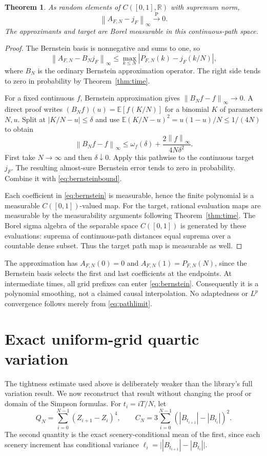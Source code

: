 \documentclass[11pt]{article}
\newtheorem{theorem}{Theorem}[section]
\theoremstyle{remark}\newtheorem{remark}[theorem]{Remark}
\newcommand{\R}{\mathbb R}\newcommand{\Pconv}{\xrightarrow{\mathrm P}}
\newcommand{\norm}[1]{\left\lVert#1\right\rVert}
\begin{document}
\begin{theorem}\label{thm:path}
As random elements of $C([0,1],\R)$ with supremum norm,
\begin{equation}\label{eq:pathlimit}
 \norm{A_{F,N}-j_F}_\infty\Pconv0.
\end{equation}
The approximants and target are Borel measurable in this
continuous-path space.
\end{theorem}
\begin{proof}
The Bernstein basis is nonnegative and sums to one, so
\begin{equation}\label{eq:bernsteinbound}
 \norm{A_{F,N}-B_Nj_F}_\infty
 \leq\max_{k\leq N}|P_{F,N}(k)-j_F(k/N)|,
\end{equation}
where $B_N$ is the ordinary Bernstein approximation operator.
The right side tends to zero in probability by
Theorem~\ref{thm:time}.

For a fixed continuous $f$, Bernstein approximation gives
$\norm{B_Nf-f}_\infty\to0$. A direct
proof writes $(B_Nf)(u)=\mathbb E[f(K/N)]$ for a binomial
$K$ of parameters $N,u$. Split at $|K/N-u|\leq\delta$ and use
$\mathbb E(K/N-u)^2=u(1-u)/N\leq1/(4N)$ to obtain
\[
 \norm{B_Nf-f}_\infty
 \leq\omega_f(\delta)+\frac{2\norm f_\infty}{4N\delta^2}.
\]
First take $N\to\infty$ and then $\delta\downarrow0$.
Apply this pathwise to the continuous target $j_F$.
The resulting almost-sure Bernstein error tends to zero in
probability. Combine it with \eqref{eq:bernsteinbound}.

Each coefficient in \eqref{eq:bernstein} is measurable, hence
the finite polynomial is a measurable $C([0,1])$-valued map.
For the target, rational evaluation maps are measurable by
the measurability arguments following Theorem~\ref{thm:time}.
The Borel sigma algebra of the separable space $C([0,1])$ is
generated by these evaluations: suprema of continuous-path
distances equal suprema over a countable dense subset. Thus the
target path map is measurable as well.
\end{proof}

The approximation has $A_{F,N}(0)=0$ and
$A_{F,N}(1)=P_{F,N}(N)$, since the Bernstein basis selects the
first and last coefficients at the endpoints. At intermediate
times, all grid prefixes can enter \eqref{eq:bernstein}.
Consequently it is a polynomial smoothing, not a claimed causal
interpolation. No adaptedness or $L^p$ convergence follows merely
from \eqref{eq:pathlimit}.

\section{Exact uniform-grid quartic variation}\label{sec:variation}
The tightness estimate used above is deliberately weaker than the
library's full variation result. We now reconstruct that result
without changing the proof or domain of the Simpson formulas.
For $t_i=iT/N$, let
\[
 Q_N=\sum_{i=0}^{N-1}(Z_{i+1}-Z_i)^4,
 \qquad C_N=3\sum_{i=0}^{N-1}(|B_{t_{i+1}}|-|B_{t_i}|)^2.
\]
The second quantity is the exact scenery-conditional mean of the
first, since each scenery increment has conditional variance
$\ell_i=\big||B_{t_{i+1}}|-|B_{t_i}|\big|$.
\end{document}
